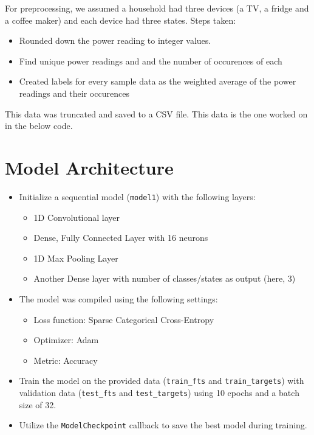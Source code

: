 \documentclass{report}
\begin{document}
For preprocessing, we assumed a household had three devices (a TV, a fridge and a coffee maker) and each device had three states. Steps taken:
\begin{itemize}
    \item Rounded down the power reading to integer values.
    \item Find unique power readings and and the number of occurences of each
    \item Created labels for every sample data as the weighted average of the power readings and their occurences
\end{itemize}

This data was truncated and saved to a CSV file. This data is the one worked on in the below code.

\section{Model Architecture}

\begin{itemize}
    \item Initialize a sequential model (\texttt{model1}) with the following layers:
    \begin{itemize}
        \item 1D Convolutional layer
        \item Dense, Fully Connected Layer with 16 neurons
        \item 1D Max Pooling Layer
        \item Another Dense layer with number of classes/states as output (here, 3)
    \end{itemize}
    \item The model was compiled using the following settings:
    \begin{itemize}
        \item Loss function: Sparse Categorical Cross-Entropy
        \item Optimizer: Adam
        \item Metric: Accuracy
    \end{itemize}
    \item Train the model on the provided data (\texttt{train\_fts} and \texttt{train\_targets}) with validation data (\texttt{test\_fts} and \texttt{test\_targets}) using 10 epochs and a batch size of 32.
    \item Utilize the \texttt{ModelCheckpoint} callback to save the best model during training.
    \end{itemize}
\end{document}
